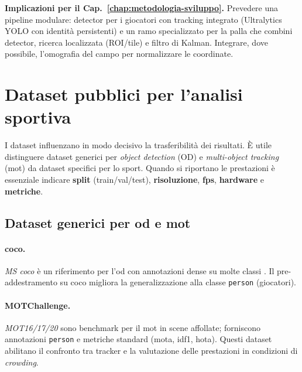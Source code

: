 \documentclass[12pt,a4paper,openright,twoside]{book}
\begin{document}
\textbf{Implicazioni per il Cap.~\ref{chap:metodologia-sviluppo}.}
Prevedere una pipeline modulare: detector per i giocatori con tracking integrato (Ultralytics YOLO con identità persistenti)
e un ramo specializzato per la palla che combini detector, ricerca localizzata (ROI/tile) e filtro di Kalman.
Integrare, dove possibile, l'omografia del campo per normalizzare le coordinate.


\section{Dataset pubblici per l'analisi sportiva}
\label{sec:dataset-pubblici}

I dataset influenzano in modo decisivo la trasferibilità dei risultati. È utile distinguere dataset generici per \emph{object detection} (OD) e \emph{multi-object tracking} (\ac{mot}) da dataset specifici per lo sport. 
Quando si riportano le prestazioni è essenziale indicare \textbf{split} (train/val/test), \textbf{risoluzione}, 
\textbf{\ac{fps}}, \textbf{hardware} e \textbf{metriche}.

\subsection{Dataset generici per \ac{od} e \ac{mot}}

\paragraph{\ac{coco}.} \textit{MS \ac{coco}} è un riferimento per l'\ac{od} con annotazioni dense su molte classi \cite{lin2014microsoft}. 
Il pre-addestramento su \ac{coco} migliora la generalizzazione alla classe \texttt{person} (giocatori).

\paragraph{MOTChallenge.} \textit{MOT16/17/20} sono benchmark per il \ac{mot} in scene affollate; forniscono annotazioni 
\texttt{person} e metriche standard (\ac{mota}, \ac{idf1}, \ac{hota}). Questi dataset abilitano il confronto tra tracker e la valutazione 
delle prestazioni in condizioni di \emph{crowding}. 
\end{document}
